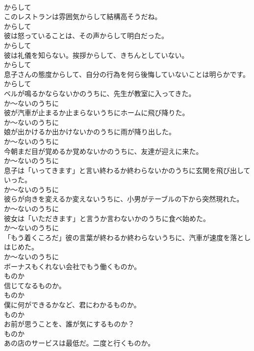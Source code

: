 \documentclass[8pt]{extreport}
\begin{document}
\begin{CJK}{UTF8}{min}
\\	からして
\\	このレストランは雰囲気からして結構高そうだね。	
\\	からして
\\	彼は怒っていることは、その声からして明白だった。	
\\	からして
\\	彼は礼儀を知らない。挨拶からして、きちんとしていない。	
\\	からして
\\	息子さんの態度からして、自分の行為を何ら後悔していないことは明らかです。	
\\	からして
\\	ベルが鳴るかならないかのうちに、先生が教室に入ってきた。	
\\	か～ないのうちに
\\	彼が汽車が止まるか止まらないうちにホームに飛び降りた。	
\\	か～ないのうちに
\\	娘が出かけるか出かけないかのうちに雨が降り出した。	
\\	か～ないのうちに
\\	今朝まだ目が覚めるか覚めないかのうちに、友達が迎えに来た。	
\\	か～ないのうちに
\\	息子は「いってきます」と言い終わるか終わらないかのうちに玄関を飛び出していった。	
\\	か～ないのうちに
\\	彼らが向きを変えるか変えないうちに、小男がテーブルの下から突然現れた。	
\\	か～ないのうちに
\\	彼女は「いただきます」と言うか言わないかのうちに食べ始めた。	
\\	か～ないのうちに
\\	「もう着くころだ」彼の言葉が終わるか終わらないうちに、汽車が速度を落としはじめた。	
\\	か～ないのうちに
\\	ボーナスもくれない会社でもう働くものか。	
\\	ものか
\\	信じてなるものか。	
\\	ものか
\\	僕に何ができるかなど、君にわかるものか。	
\\	ものか
\\	お前が思うことを、誰が気にするものか？	
\\	ものか
\\	あの店のサービスは最低だ。二度と行くものか。	

\end{CJK}
\end{document}
